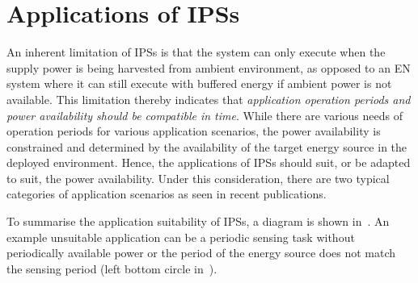

\section{Applications of IPSs}

An inherent limitation of IPSs is that the system can only execute when the supply power is being  harvested from ambient environment, as opposed to an EN system where it can still execute with buffered energy if ambient power is not available. 
This limitation thereby indicates that \textit{application operation periods and power availability should be compatible in time}. 
While there are various needs of operation periods for various application scenarios, the power availability is constrained and determined by the availability of the target energy source in the deployed environment. 
Hence, the applications of IPSs should suit, or be adapted to suit, the power availability. 
Under this consideration, there are two typical categories of application scenarios as seen in recent publications. 

To summarise the application suitability of IPSs, a diagram is shown in~. 
An example unsuitable application can be a periodic sensing task without periodically available power or the period of the energy source does not match the sensing period (left bottom circle in~).

